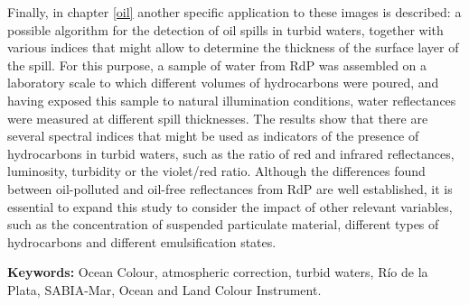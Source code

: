 Finally, in chapter \ref{oil} another specific application to these images is described: a possible algorithm for the detection of oil spills in turbid waters, together with various indices that might allow to determine the thickness of the surface layer of the spill. For this purpose, a sample of water from RdP was assembled on a laboratory scale to which different volumes of hydrocarbons were poured, and having exposed this sample to natural illumination conditions, water reflectances were measured at different spill thicknesses. The results show that there are several spectral indices that might be used as indicators of the presence of hydrocarbons in turbid waters, such as the ratio of red and infrared reflectances, luminosity, turbidity or the violet/red ratio. Although the differences found between oil-polluted and oil-free reflectances from RdP are well established, it is essential to expand this study to consider the impact of other relevant variables, such as the concentration of suspended particulate material, different types of hydrocarbons and different emulsification states.

\bigskip

\noindent\textbf{Keywords:} Ocean Colour, atmospheric correction, turbid waters, Río de la Plata, SABIA-Mar, Ocean and Land Colour Instrument.